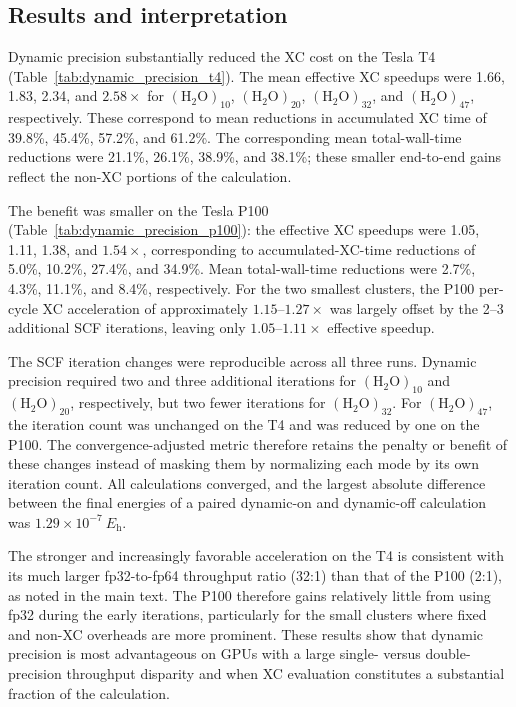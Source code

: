 \subsection{Results and interpretation}

Dynamic precision substantially reduced the XC cost on the Tesla T4
(Table~\ref{tab:dynamic_precision_t4}).  The
mean effective XC speedups were 1.66, 1.83, 2.34, and $2.58\times$ for
$(\mathrm{H_2O})_{10}$, $(\mathrm{H_2O})_{20}$,
$(\mathrm{H_2O})_{32}$, and $(\mathrm{H_2O})_{47}$, respectively.  These
correspond to mean reductions in accumulated XC time of 39.8\%, 45.4\%,
57.2\%, and 61.2\%.  The corresponding mean total-wall-time reductions were
21.1\%, 26.1\%, 38.9\%, and 38.1\%; these smaller end-to-end gains reflect
the non-XC portions of the calculation.

The benefit was smaller on the Tesla P100
(Table~\ref{tab:dynamic_precision_p100}): the effective XC speedups were
1.05, 1.11, 1.38, and $1.54\times$, corresponding to accumulated-XC-time
reductions of 5.0\%, 10.2\%, 27.4\%, and 34.9\%.  Mean total-wall-time
reductions were 2.7\%, 4.3\%, 11.1\%, and 8.4\%, respectively.  For the two
smallest clusters, the P100 per-cycle XC acceleration of approximately
$1.15$--$1.27\times$ was largely offset by the 2--3 additional SCF
iterations, leaving only $1.05$--$1.11\times$ effective speedup.

The SCF iteration changes were reproducible across all three runs.  Dynamic
precision required two and three additional iterations for
$(\mathrm{H_2O})_{10}$ and $(\mathrm{H_2O})_{20}$, respectively, but two
fewer iterations for $(\mathrm{H_2O})_{32}$.  For
$(\mathrm{H_2O})_{47}$, the iteration count was unchanged on the T4 and was
reduced by one on the P100.  The convergence-adjusted metric therefore
retains the penalty or benefit of these changes instead of masking them by
normalizing each mode by its own iteration count.  All calculations
converged, and the largest absolute difference between the final energies of
a paired dynamic-on and dynamic-off calculation was
$1.29\times10^{-7}\ E_{\mathrm h}$.

The stronger and increasingly favorable acceleration on the T4 is consistent
with its much larger fp32-to-fp64 throughput ratio (32:1) than that of the
P100 (2:1), as noted in the main text.  The P100 therefore gains relatively
little from using fp32 during the early iterations, particularly for the
small clusters where fixed and non-XC overheads are more prominent.  These
results show that dynamic precision is most advantageous on GPUs with a large
single- versus double-precision throughput disparity and when XC evaluation
constitutes a substantial fraction of the calculation.
